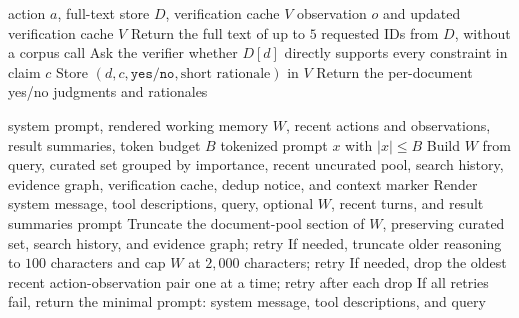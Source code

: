 \documentclass{article}
\newcommand{\verify}{\texttt{verify}\xspace}
\begin{document}
\begin{algorithm}[t]
\caption{Verification and memory review.}
\label{alg:verify-review}
\small
\begin{algorithmic}[1]
\REQUIRE action $a$, full-text store $D$, verification cache $V$
\ENSURE observation $o$ and updated verification cache $V$
  \STATE Return the full text of up to $5$ requested IDs from $D$, without a corpus call
\ELSIF{$a=\verify(\mathcal{D},c)$}
    \STATE Ask the verifier whether $D[d]$ directly supports every constraint in claim $c$
    \STATE Store $(d,c,\texttt{yes/no},\text{short rationale})$ in $V$
  \ENDFOR
  \STATE Return the per-document yes/no judgments and rationales
\ENDIF
\end{algorithmic}
\end{algorithm}

\begin{algorithm}[t]
\caption{Budget-safe context rendering.}
\label{alg:render}
\small
\begin{algorithmic}[1]
\REQUIRE system prompt, rendered working memory $W$, recent actions and observations, result summaries, token budget $B$
\ENSURE tokenized prompt $x$ with $|x|\leq B$
\STATE Build $W$ from query, curated set grouped by importance, recent uncurated pool, search history, evidence graph, verification cache, dedup notice, and context marker
\STATE Render system message, tool descriptions, query, optional $W$, recent turns, and result summaries
  \RETURN prompt
\ENDIF
\STATE Truncate the document-pool section of $W$, preserving curated set, search history, and evidence graph; retry
\STATE If needed, truncate older reasoning to $100$ characters and cap $W$ at $2{,}000$ characters; retry
\STATE If needed, drop the oldest recent action-observation pair one at a time; retry after each drop
\STATE If all retries fail, return the minimal prompt: system message, tool descriptions, and query
\end{algorithmic}
\end{algorithm}
\end{document}
